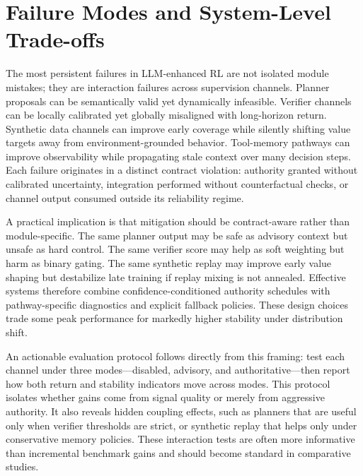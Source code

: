 ﻿\documentclass[conference]{IEEEtran}
\begin{document}
\section{Failure Modes and System-Level Trade-offs}
The most persistent failures in LLM-enhanced RL are not isolated module mistakes; they are interaction failures across supervision channels. Planner proposals can be semantically valid yet dynamically infeasible. Verifier channels can be locally calibrated yet globally misaligned with long-horizon return. Synthetic data channels can improve early coverage while silently shifting value targets away from environment-grounded behavior. Tool-memory pathways can improve observability while propagating stale context over many decision steps. Each failure originates in a distinct contract violation: authority granted without calibrated uncertainty, integration performed without counterfactual checks, or channel output consumed outside its reliability regime.

A practical implication is that mitigation should be contract-aware rather than module-specific. The same planner output may be safe as advisory context but unsafe as hard control. The same verifier score may help as soft weighting but harm as binary gating. The same synthetic replay may improve early value shaping but destabilize late training if replay mixing is not annealed. Effective systems therefore combine confidence-conditioned authority schedules with pathway-specific diagnostics and explicit fallback policies. These design choices trade some peak performance for markedly higher stability under distribution shift.

An actionable evaluation protocol follows directly from this framing: test each channel under three modes---disabled, advisory, and authoritative---then report how both return and stability indicators move across modes. This protocol isolates whether gains come from signal quality or merely from aggressive authority. It also reveals hidden coupling effects, such as planners that are useful only when verifier thresholds are strict, or synthetic replay that helps only under conservative memory policies. These interaction tests are often more informative than incremental benchmark gains and should become standard in comparative studies.
\end{document}
